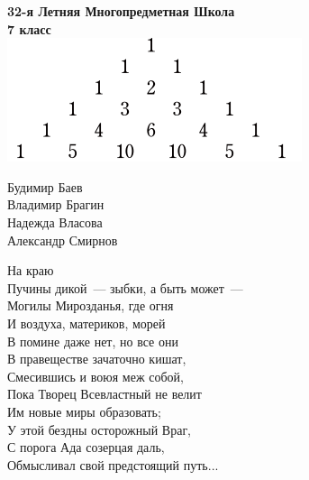 \documentclass[10pt]{book}
\begin{document}
\begin{center}
	\Huge{\bf 32-я Летняя Многопредметная Школа}\\
	\Large{\bf 7 класс}\\ \vspace{.3cm}
	\includegraphics[width=\textwidth]{pasc}
	\begin{multicols}{2}
		Будимир Баев \\
		Владимир Брагин \\
		Надежда Власова \\
		Александр Смирнов \\
	\end{multicols}
\end{center}

\newpage

\begin{center}
На краю \\
Пучины дикой~--- зыбки, а быть может~--- \\
Могилы Мирозданья, где огня\\
И воздуха, материков, морей\\
В помине даже нет, но все они\\
В правеществе зачаточно кишат,\\
Смесившись и воюя меж собой,\\
Пока Творец Всевластный не велит\\
Им новые миры образовать;\\
У этой бездны осторожный Враг,\\
С порога Ада созерцая даль,\\
Обмысливал свой предстоящий путь...
\end{center}

\tableofcontents\newpage

\renewcommand{\@oddhead}{\vbox{\hbox to \textwidth{{\raisebox{1.8mm}{\strut{\small\bfseries Кировская ЛМШ 2016, 7 класс}}\hfil\raisebox{1.8mm}{\strut\bfseries\thepage}}}\hrule}}
\renewcommand{\@evenhead}{\vbox{\hbox to \textwidth{{\raisebox{1.8mm}{\strut\bfseries\thepage}\hfil\raisebox{1.8mm}{\strut{\small\bfseries Кировская ЛМШ 2016, 7 класс}}}}\hrule}}
\end{document}
